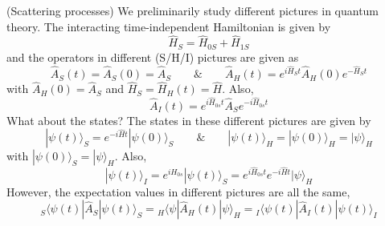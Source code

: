\vspace{2ex}
\begin{defi}
(Scattering processes) We preliminarily study different pictures in quantum theory. The interacting time-independent Hamiltonian is given by 
\[\hat{H}_{S}=\hat{H}_{0S}+\hat{H}_{1S}\]
and the operators in different (S/H/I) pictures are given as
\[\hat{A}_{S}(t)=\hat{A}_{S}(0)=\hat{A}_{S}\qquad\&\qquad \hat{A}_{H}(t)=e^{i\hat{H}_{S}t}\hat{A}_{H}(0)e^{-\hat{H}_{S}t}\]
with $\hat{A}_{H}(0)=\hat{A}_{S}$ and $\hat{H}_{S}=\hat{H}_{H}(t)=\hat{H}$. Also,
\[\hat{A}_{I}(t)=e^{i\hat{H}_{0s}t}\hat{A}_{S}e^{-i\hat{H}_{0s}t}\]
What about the states? The states in these different pictures are given by 
\[|\psi (t)\rangle _{S}=e^{-i\hat{H}t}|\psi (0)\rangle _{S}\qquad\&\qquad |\psi (t)\rangle _{H}=|\psi (0)\rangle _{H}=|\psi \rangle _{H}\]
with $|\psi (0)\rangle _{S}=|\psi \rangle _{H}$. Also,
\[|\psi (t)\rangle _{I}=e^{iH_{0s}}|\psi (t)\rangle _{S}=e^{i\hat{H}_{0s}t}e^{-i\hat{H}t}|\psi \rangle _{H}\]
However, the expectation values in different pictures are all the same,
\[{}_{S}\langle \psi (t)|\hat{A}_{S}|\psi (t)\rangle _{S}={}_{H}\langle \psi |\hat{A}_{H}(t)|\psi \rangle _{H}={}_{I}\langle \psi (t)|\hat{A}_{I}(t)|\psi (t)\rangle _{I}\]
\end{defi}
\vspace{2ex}
